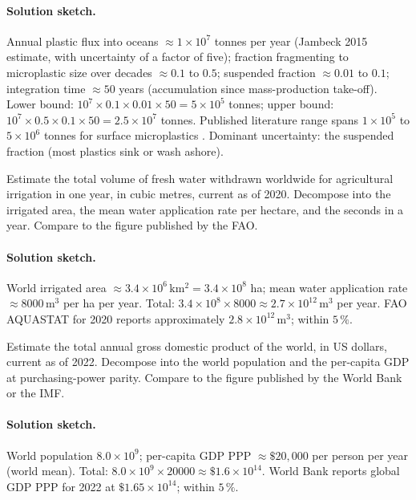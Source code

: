 \paragraph{Solution sketch.}
Annual plastic flux into oceans $\approx 1 \times 10^{7}$ tonnes
per year (Jambeck 2015 estimate, with uncertainty of a factor of
five); fraction fragmenting to microplastic size over decades
$\approx 0.1$ to $0.5$; suspended fraction $\approx 0.01$ to
$0.1$; integration time $\approx 50$ years (accumulation since
mass-production take-off). Lower bound: $10^{7} \times 0.1 \times
0.01 \times 50 = 5 \times 10^{5}$ tonnes; upper bound: $10^{7}
\times 0.5 \times 0.1 \times 50 = 2.5 \times 10^{7}$ tonnes.
Published literature range spans $1 \times 10^{5}$ to $5 \times
10^{6}$ tonnes for surface microplastics
\cite{paper:zhao2025-ocean-microplastics}. Dominant uncertainty:
the suspended fraction (most plastics sink or wash ashore).

\begin{exercise}
Estimate the total volume of fresh water withdrawn worldwide for
agricultural irrigation in one year, in cubic metres, current as
of 2020. Decompose into the irrigated area, the mean water
application rate per hectare, and the seconds in a year. Compare
to the figure published by the FAO.
\end{exercise}

\paragraph{Solution sketch.}
World irrigated area $\approx 3.4 \times 10^{6} \,\si{\kilo\meter
\squared} = 3.4 \times 10^{8}$ ha; mean water application rate
$\approx 8000 \,\si{\meter\cubed}$ per ha per year. Total: $3.4
\times 10^{8} \times 8000 \approx 2.7 \times 10^{12}
\,\si{\meter\cubed}$ per year. FAO AQUASTAT for 2020 reports
approximately $2.8 \times 10^{12} \,\si{\meter\cubed}$; within
$5\,\%$.

\begin{exercise}
Estimate the total annual gross domestic product of the world, in
US dollars, current as of 2022. Decompose into the world population
and the per-capita GDP at purchasing-power parity. Compare to the
figure published by the World Bank or the IMF.
\end{exercise}

\paragraph{Solution sketch.}
World population $8.0 \times 10^{9}$; per-capita GDP PPP $\approx
\$20{,}000$ per person per year (world mean). Total: $8.0 \times
10^{9} \times 20000 \approx \$1.6 \times 10^{14}$. World Bank
reports global GDP PPP for 2022 at $\$1.65 \times 10^{14}$;
within $5\,\%$.

